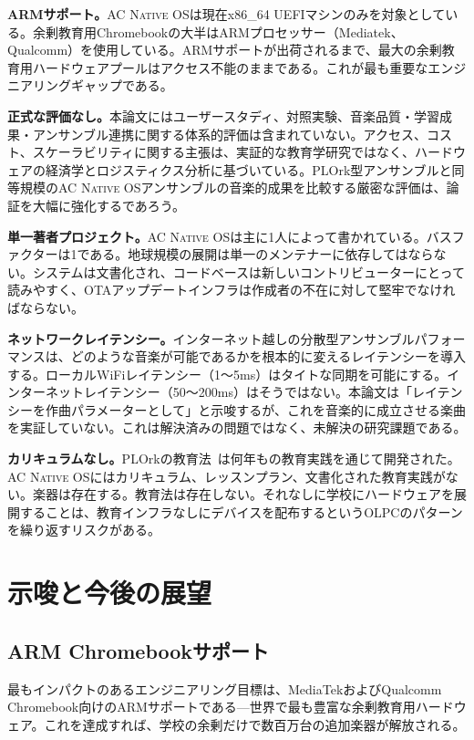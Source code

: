 \documentclass[10pt,letterpaper,twocolumn]{article}
\newcommand{\acos}{\textsc{AC Native OS}}
\begin{document}
\textbf{ARMサポート。}\acos{}は現在x86\_64 UEFIマシンのみを対象としている。余剰教育用Chromebookの大半はARMプロセッサー（Mediatek、Qualcomm）を使用している。ARMサポートが出荷されるまで、最大の余剰教育用ハードウェアプールはアクセス不能のままである。これが最も重要なエンジニアリングギャップである。

\textbf{正式な評価なし。}本論文にはユーザースタディ、対照実験、音楽品質・学習成果・アンサンブル連携に関する体系的評価は含まれていない。アクセス、コスト、スケーラビリティに関する主張は、実証的な教育学研究ではなく、ハードウェアの経済学とロジスティクス分析に基づいている。PLOrk型アンサンブルと同等規模の\acos{}アンサンブルの音楽的成果を比較する厳密な評価は、論証を大幅に強化するであろう。

\textbf{単一著者プロジェクト。}\acos{}は主に1人によって書かれている。バスファクターは1である。地球規模の展開は単一のメンテナーに依存してはならない。システムは文書化され、コードベースは新しいコントリビューターにとって読みやすく、OTAアップデートインフラは作成者の不在に対して堅牢でなければならない。

\textbf{ネットワークレイテンシー。}インターネット越しの分散型アンサンブルパフォーマンスは、どのような音楽が可能であるかを根本的に変えるレイテンシーを導入する。ローカルWiFiレイテンシー（1〜5ms）はタイトな同期を可能にする。インターネットレイテンシー（50〜200ms）はそうではない。本論文は「レイテンシーを作曲パラメーターとして」と示唆するが、これを音楽的に成立させる楽曲を実証していない。これは解決済みの問題ではなく、未解決の研究課題である。

\textbf{カリキュラムなし。}PLOrkの教育法~\citep{trueman2007why}は何年もの教育実践を通じて開発された。\acos{}にはカリキュラム、レッスンプラン、文書化された教育実践がない。楽器は存在する。教育法は存在しない。それなしに学校にハードウェアを展開することは、教育インフラなしにデバイスを配布するというOLPCのパターンを繰り返すリスクがある。


\section{示唆と今後の展望}
\label{sec:future}

\subsection{ARM Chromebookサポート}

最もインパクトのあるエンジニアリング目標は、MediaTekおよびQualcomm Chromebook向けのARMサポートである---世界で最も豊富な余剰教育用ハードウェア。これを達成すれば、学校の余剰だけで数百万台の追加楽器が解放される。
\end{document}
